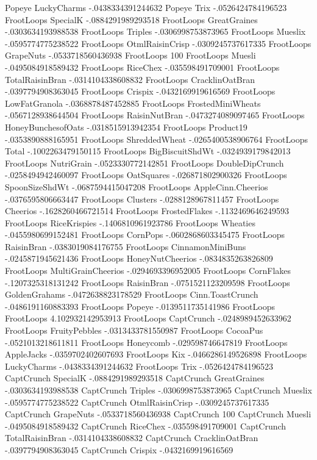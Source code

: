 Popeye	LuckyCharms	-.0438334391244632
Popeye	Trix	-.0526424784196523
FrootLoops	SpecialK	-.0884291989293518
FrootLoops	GreatGraines	-.0303634193988538
FrootLoops	Triples	-.0306998753873965
FrootLoops	Mueslix	-.0595774775238522
FrootLoops	OtmlRaisinCrisp	-.0309245737617335
FrootLoops	GrapeNuts	-.0533718560436938
FrootLoops	100%
FrootLoops	Muesli	-.0495084918589432
FrootLoops	RiceChex	-.035598491709001
FrootLoops	TotalRaisinBran	-.0314104338608832
FrootLoops	CracklinOatBran	-.0397794908363045
FrootLoops	Crispix	-.0432169919616569
FrootLoops	LowFatGranola	-.0368878487452885
FrootLoops	FrostedMiniWheats	-.0567128938644504
FrootLoops	RaisinNutBran	-.0473274089097465
FrootLoops	HoneyBunchesofOats	-.0318515913942354
FrootLoops	Product19	-.0353890888165951
FrootLoops	ShreddedWheat	-.0265400538906764
FrootLoops	Total	-.1002263479150115
FrootLoops	BigBiscuitShdWt	-.0324939179842013
FrootLoops	NutriGrain	-.0523330772142851
FrootLoops	DoubleDipCrunch	-.0258494942460097
FrootLoops	OatSquares	-.026871802900326
FrootLoops	SpoonSizeShdWt	-.0687594415047208
FrootLoops	AppleCinn.Cheerios	-.0376595806663447
FrootLoops	Clusters	-.0288128967811457
FrootLoops	Cheerios	-.1628260466721514
FrootLoops	FrostedFlakes	-.1132469646249593
FrootLoops	RiceKrispies	-.1406810961923786
FrootLoops	Wheaties	-.0455980699152481
FrootLoops	CornPops	-.0602868603345475
FrootLoops	RaisinBran	-.0383019084176755
FrootLoops	CinnamonMiniBuns	-.0245871945621436
FrootLoops	HoneyNutCheerios	-.0834835263826809
FrootLoops	MultiGrainCheerios	-.0294693396952005
FrootLoops	CornFlakes	-.1207325318131242
FrootLoops	RaisinBran	-.0751521123209598
FrootLoops	GoldenGrahams	-.0472638823178529
FrootLoops	Cinn.ToastCrunch	-.0486191160883393
FrootLoops	Popeye	-.0139511735141986
FrootLoops	FrootLoops	4.102932142953913
FrootLoops	CaptCrunch	-.0248989452633962
FrootLoops	FruityPebbles	-.0313433781550987
FrootLoops	CocoaPus	-.0521013218611811
FrootLoops	Honeycomb	-.029598746647819
FrootLoops	AppleJacks	-.0359702402607693
FrootLoops	Kix	-.0466286149526898
FrootLoops	LuckyCharms	-.0438334391244632
FrootLoops	Trix	-.0526424784196523
CaptCrunch	SpecialK	-.0884291989293518
CaptCrunch	GreatGraines	-.0303634193988538
CaptCrunch	Triples	-.0306998753873965
CaptCrunch	Mueslix	-.0595774775238522
CaptCrunch	OtmlRaisinCrisp	-.0309245737617335
CaptCrunch	GrapeNuts	-.0533718560436938
CaptCrunch	100%
CaptCrunch	Muesli	-.0495084918589432
CaptCrunch	RiceChex	-.035598491709001
CaptCrunch	TotalRaisinBran	-.0314104338608832
CaptCrunch	CracklinOatBran	-.0397794908363045
CaptCrunch	Crispix	-.0432169919616569
